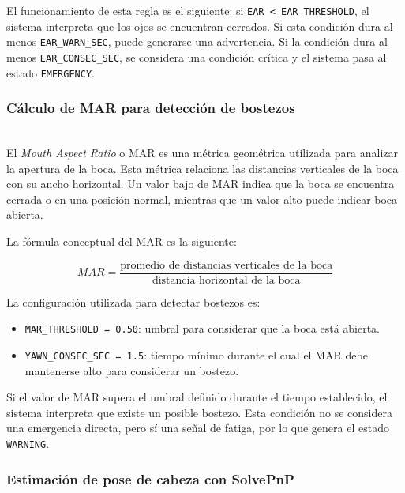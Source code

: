 \documentclass[conference]{IEEEtran}
\begin{document}
El funcionamiento de esta regla es el siguiente: si \texttt{EAR < EAR\_THRESHOLD}, el sistema interpreta que los ojos se encuentran cerrados. Si esta condición dura al menos \texttt{EAR\_WARN\_SEC}, puede generarse una advertencia. Si la condición dura al menos \texttt{EAR\_CONSEC\_SEC}, se considera una condición crítica y el sistema pasa al estado \texttt{EMERGENCY}.\\

\subsubsection{Cálculo de MAR para detección de bostezos}\mbox{}\\

El \textit{Mouth Aspect Ratio} o MAR es una métrica geométrica utilizada para analizar la apertura de la boca. Esta métrica relaciona las distancias verticales de la boca con su ancho horizontal. Un valor bajo de MAR indica que la boca se encuentra cerrada o en una posición normal, mientras que un valor alto puede indicar boca abierta.

La fórmula conceptual del MAR es la siguiente:

\begin{equation}
MAR = \frac{\text{promedio de distancias verticales de la boca}}{\text{distancia horizontal de la boca}}
\end{equation}

La configuración utilizada para detectar bostezos es:

\begin{itemize}
    \item \texttt{MAR\_THRESHOLD = 0.50}: umbral para considerar que la boca está abierta.
    
    \item \texttt{YAWN\_CONSEC\_SEC = 1.5}: tiempo mínimo durante el cual el MAR debe mantenerse alto para considerar un bostezo.
\end{itemize}

Si el valor de MAR supera el umbral definido durante el tiempo establecido, el sistema interpreta que existe un posible bostezo. Esta condición no se considera una emergencia directa, pero sí una señal de fatiga, por lo que genera el estado \texttt{WARNING}. \\

\subsubsection{Estimación de pose de cabeza con SolvePnP}\mbox{}\\
\end{document}

